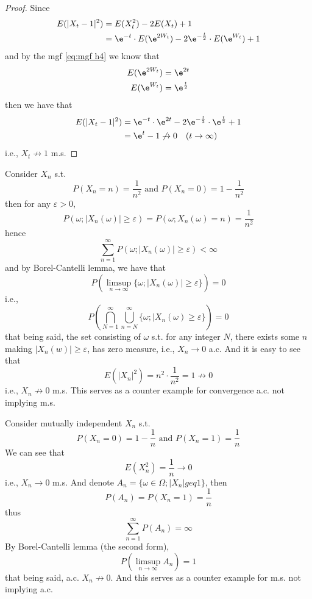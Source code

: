 \begin{subproblem}
        \item
        \begin{proof}
            Since
            \[\begin{aligned}
                E(|X_t-1|^2)&=E(X_t^2)-2E(X_t)+1\\
                &=\e^{-t}\cdot E(\e^{2W_t})
                  -2\e^{-\frac t2}\cdot E(\e^{W_t})+1
            \end{aligned}\]
            and by the mgf \cref{eq:mgf h4} we know that
            \[\begin{aligned}
                E(\e^{2W_t})&=\e^{2t}\\
                E(\e^{W_t})&=\e^{\frac t2}\\
            \end{aligned}\]
            then we have that
            \[\begin{aligned}
                E(|X_t-1|^2)&=\e^{-t}\cdot\e^{2t}
                -2\e^{-\frac t2}\cdot\e^{\frac t2}+1\\
                &=\e^t-1\not\to 0\quad(t\to\infty)
            \end{aligned}\]
            i.e., $X_t\not\to 1$ m.s.
        \end{proof}

        \item
        Consider $X_n$ s.t.
        \[P(X_n=n)=\frac{1}{n^2}\text{ and }P(X_n=0)=1-\frac{1}{n^2}\]
        then for any $\varepsilon>0$,
        \[P(\omega;|X_n(\omega)|\geq\varepsilon)=P(\omega;X_n(\omega)=n)
        =\frac{1}{n^2}\]
        hence
        \[\sum_{n=1}^\infty P(\omega;|X_n(\omega)|\geq\varepsilon)<\infty\]
        and by Borel-Cantelli lemma, we have that
        \[P\left(\limsup_{n\to\infty}\{\omega;|X_n(\omega)|\geq\varepsilon\}\right)
        =0\]
        i.e.,
        \[P\left(\bigcap_{N=1}^\infty\bigcup_{n=N}^\infty
        \{\omega;|X_n(\omega)\geq\varepsilon\}\right)=0\]
        that being said, the set consisting of $\omega$ s.t.
        for any integer $N$,
        there exists some $n$ making $|X_n(w)|\geq\varepsilon$,
        has zero measure, i.e., $X_n\to 0$ a.c.
        And it is easy to see that
        \[E(|X_n|^2)=n^2\cdot\frac{1}{n^2}=1\not\to 0\]
        i.e., $X_n\not\to 0$ m.s. This serves as a counter example
        for convergence a.c. not implying m.s.

        Consider mutually independent $X_n$ s.t.
        \[P(X_n=0)=1-\frac{1}{n}\text{ and }
        P(X_n=1)=\frac{1}{n}\]
        We can see that
        \[E(X_n^2)=\frac{1}{n}\to 0\]
        i.e., $X_n\to 0$ m.s.
        And denote $A_n=\{\omega\in\Omega;|X_n|geq 1\}$,
        then
        \[P(A_n)=P(X_n=1)=\frac{1}{n}\]
        thus
        \[\sum_{n=1}^\infty P(A_n)=\infty\]
        By Borel-Cantelli lemma (the second form),
        \[P\left(\limsup_{n\to\infty}A_n\right)=1\]
        that being said,
        a.c. $X_n\not\to 0$. And this serves as a counter example
        for m.s. not implying a.c.


\end{subproblem}
